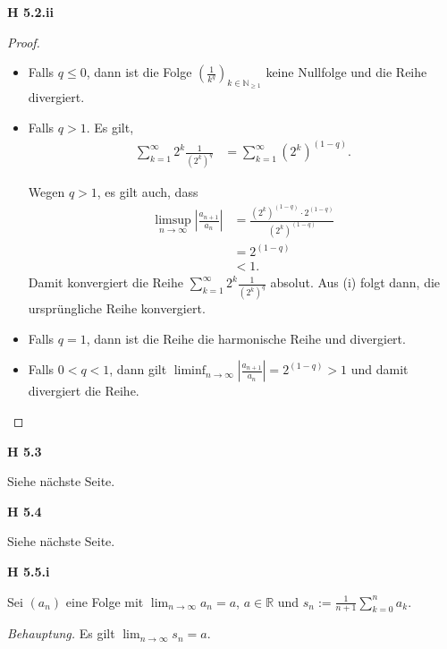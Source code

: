 \documentclass[12pt]{extarticle}
\begin{document}
\textbf{H 5.2.ii}
\begin{proof}

  \begin{itemize}
  \item Falls \(q \leq 0\), dann ist die Folge
    \((\frac{1}{k^q})_{k \in \mathbb{N}_{\geq 1}}\) keine Nullfolge und
    die Reihe divergiert.
  \item Falls \(q > 1\).
    Es gilt,
\begin{align*}
  \sum_{k=1}^{\infty}{2^k \frac{1}{(2^k)^q}} &= \sum_{k=1}^{\infty}{(2^k)^{(1-q)}}.
\end{align*}

Wegen \(q > 1\), es gilt auch, dass
\begin{align*}
\limsup_{n\rightarrow\infty}{\left| \frac{a_{n+1}}{a_n}
  \right|}&=\frac{(2^k)^{(1-q)}\cdot 2^{(1-q)}}{(2^k)^{(1-q)}}\\
          &= 2^{(1-q)} \\
          &< 1.
\end{align*}
Damit konvergiert die Reihe $\sum_{k=1}^{\infty}{2^k
  \frac{1}{(2^k)^q}}$ absolut.  Aus (i) folgt dann, die ursprüngliche
Reihe konvergiert.
\item Falls \(q = 1\), dann ist die Reihe die harmonische Reihe und
  divergiert.
\item Falls \(0< q <1\), dann gilt
  $\liminf_{n\rightarrow\infty}{\left| \frac{a_{n+1}}{a_n}
    \right|}=2^{(1-q)}>1$ und damit divergiert die Reihe.
  \end{itemize}
\end{proof}

\newpage

\textbf{H 5.3}

Siehe nächste Seite.

\textbf{H 5.4}

Siehe nächste Seite.

\newpage

\textbf{H 5.5.i}

Sei \((a_n)\) eine Folge mit
\(\lim_{n\rightarrow\infty}{a_n}=a\), \(a \in \mathbb{R}\) und
\(s_n:=\frac{1}{n+1}\sum_{k=0}^n{a_k}\).

\textit{Behauptung.}  Es gilt \(\lim_{n\rightarrow\infty}{s_n}=a\).
\end{document}

